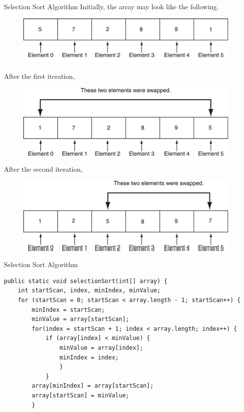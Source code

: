 \documentclass[11pt]{beamer}
\begin{document}
\begin{frame}{Selection Sort Algorithm}
    Initially, the array may look like the following.
    \noindent 
    \begin{figure}[H]
    \centering
    \includegraphics[scale=0.5]{Images/chapter07_section11_SortAlgorithm.png}
    \end{figure}
    After the first iteration,
    \noindent 
    \begin{figure}[H]
    \centering
    \includegraphics[scale=0.5]{Images/chapter07_section11_SortAlgorithm02.png}
    \end{figure}
    After the second iteration,
    \noindent 
    \begin{figure}[H]
    \centering
    \includegraphics[scale=0.5]{Images/chapter07_section11_SortAlgorithm03.png}
    \end{figure}
\end{frame}

\begin{frame}[fragile]
{Selection Sort Algorithm}
    \begin{lstlisting}[basicstyle=\ttfamily\footnotesize]
public static void selectionSort(int[] array) {
    int startScan, index, minIndex, minValue;
    for (startScan = 0; startScan < array.length - 1; startScan++) {
        minIndex = startScan;
        minValue = array[startScan];
        for(index = startScan + 1; index < array.length; index++) {
            if (array[index] < minValue) {
                minValue = array[index];
                minIndex = index; 
                }
            }
        array[minIndex] = array[startScan];
        array[startScan] = minValue;
        }
    \end{lstlisting}
\end{frame}
\end{document}
